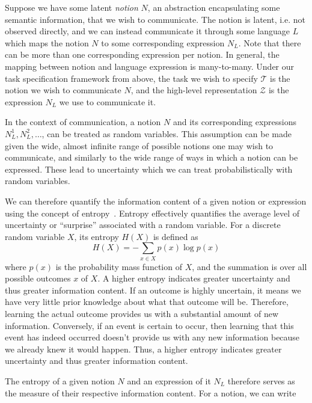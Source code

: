 \documentclass[../main.tex]{subfiles}
\begin{document}
Suppose we have some latent \emph{notion} $N$, an abstraction encapsulating some semantic
information, that we wish to communicate. The notion is latent, i.e. not observed directly, and we
can instead communicate it through some language $L$ which maps the notion $N$ to some corresponding
expression $N_L$. Note that there can be more than one corresponding expression per notion. In
general, the mapping between notion and language expression is many-to-many. Under our task
specification framework from above, the task we wish to specify $\mathcal{T}$ is the notion we wish
to communicate $N$, and the high-level representation $\mathcal{Z}$ is the expression $N_L$ we use
to communicate it.

In the context of communication, a notion $N$ and its corresponding expressions $N_L^1, N_L^2, \dots$,
can be treated as random variables. This assumption can be made given the wide, almost infinite
range of possible notions one may wish to communicate, and similarly to the wide range of ways in
which a notion can be expressed. These lead to uncertainty which we can treat probabilistically with
random variables.

We can therefore quantify the information content of a given notion or expression using the concept
of entropy~\citep{shannon_mathematical_1948}. Entropy effectively quantifies the average level of
uncertainty or ``surprise'' associated with a random variable. For a discrete random variable $X$,
its entropy $H(X)$ is defined as
\begin{equation}
	H(X) = -\sum_{x \in X} p(x) \log p(x)
\end{equation}
where $p(x)$ is the probability mass function of $X$, and the summation is over all possible
outcomes $x$ of $X$. A higher entropy indicates greater uncertainty and thus greater information
content. If an outcome is highly uncertain, it means we have very little prior knowledge about what
that outcome will be. Therefore, learning the actual outcome provides us with a substantial amount
of new information. Conversely, if an event is certain to occur, then learning that this event has
indeed occurred doesn't provide us with any new information because we already knew it would happen.
Thus, a higher entropy indicates greater uncertainty and thus greater information content.

The entropy of a given notion $N$ and an expression of it $N_L$ therefore serves as the measure of
their respective information content. For a notion, we can write
\end{document}
